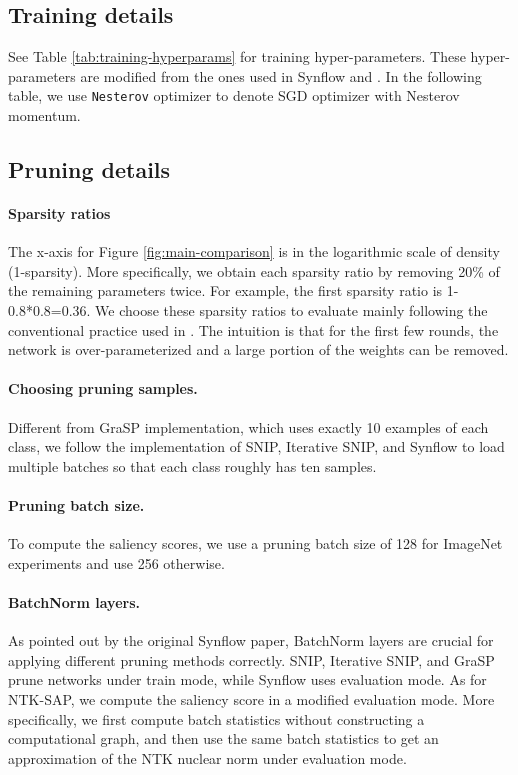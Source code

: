 \documentclass{article} %
\begin{document}
\subsection{Training details}
See Table \ref{tab:training-hyperparams} for training hyper-parameters. These hyper-parameters are modified from the ones used in Synflow \citep{synflow} and \citet{franklemissing}. In the following table, we use \texttt{Nesterov} optimizer to denote SGD optimizer with Nesterov momentum.


\subsection{Pruning details}
\paragraph{Sparsity ratios} The x-axis for Figure \ref{fig:main-comparison} is in the logarithmic scale of density (1-sparsity). More specifically, we obtain each sparsity ratio by removing 20\% of the remaining parameters twice. For example, the first sparsity ratio is 1-0.8*0.8=0.36. We choose these sparsity ratios to evaluate mainly following the conventional practice used in \citet{franklemissing}. The intuition is that for the first few rounds, the network is over-parameterized and a large portion of the weights can be removed.

\paragraph{Choosing pruning samples.} Different from GraSP implementation, which uses exactly 10 examples of each class, we follow the implementation of SNIP, Iterative SNIP, and Synflow to load multiple batches so that each class roughly has ten samples. 

\paragraph{Pruning batch size.} To compute the saliency scores, we use a pruning batch size of 128 for ImageNet experiments and use 256 otherwise.

\paragraph{BatchNorm layers.} As pointed out by the original Synflow paper, BatchNorm layers are crucial for applying different pruning methods correctly. SNIP, Iterative SNIP, and GraSP prune networks under train mode, while Synflow uses evaluation mode. 
As for NTK-SAP, we compute the saliency score in a modified evaluation mode. More specifically, we first compute batch statistics without constructing a computational graph, and then use the same batch statistics to get an approximation of the NTK nuclear norm under evaluation mode.
\end{document}
